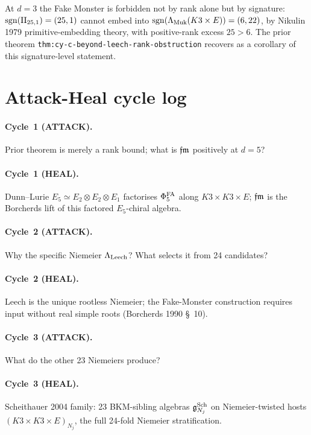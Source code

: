 At $d = 3$ the Fake Monster is forbidden not by rank alone but by
signature: $\mathrm{sgn}(\mathrm{II}_{25,1}) = (25, 1)$ cannot embed into
$\mathrm{sgn}(\Lambda_{\mathrm{Muk}}(K3 \times E)) = (6, 22)$, by Nikulin
1979 primitive-embedding theory, with positive-rank excess $25 > 6$.
The prior theorem \texttt{thm:cy-c-beyond-leech-rank-obstruction}
recovers as a corollary of this signature-level statement.

\section*{Attack-Heal cycle log}

\paragraph{Cycle~1 (ATTACK).} Prior theorem is merely a rank bound;
what is $\mathfrak{fm}$ positively at $d = 5$?

\paragraph{Cycle~1 (HEAL).} Dunn--Lurie $E_5 \simeq E_2 \otimes E_2
\otimes E_1$ factorises $\Phi^{\mathrm{FA}}_5$ along $K3 \times K3 \times E$;
$\mathfrak{fm}$ is the Borcherds lift of this factored $E_5$-chiral algebra.

\paragraph{Cycle~2 (ATTACK).} Why the specific Niemeier $\Lambda_{\mathrm{Leech}}$?
What selects it from 24 candidates?

\paragraph{Cycle~2 (HEAL).} Leech is the unique rootless Niemeier;
the Fake-Monster construction requires input without real simple
roots (Borcherds 1990 \S~10).

\paragraph{Cycle~3 (ATTACK).} What do the other 23 Niemeiers produce?

\paragraph{Cycle~3 (HEAL).} Scheithauer 2004 family: 23 BKM-sibling
algebras $\mathfrak{g}^{\mathrm{Sch}}_{N_j}$ on Niemeier-twisted hosts
$(K3 \times K3 \times E)_{N_j}$, the full 24-fold Niemeier
stratification.

